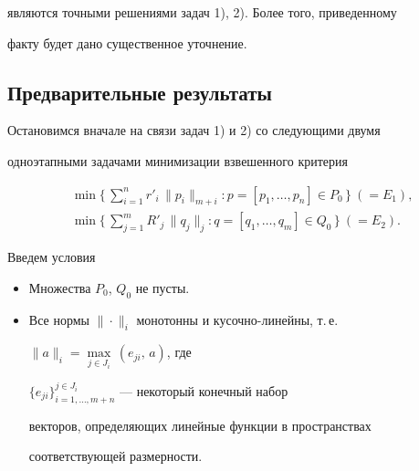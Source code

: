 являются точными решениями задач 1), 2). Более того, приведенному


факту будет дано существенное уточнение.


\addtocounter{footnote}{-1}





\subsection{Предварительные результаты}





Остановимся вначале на связи задач 1) и 2) со следующими двумя


одноэтапными задачами минимизации взвешенного критерия


\begin{align}


\label{F14}


&\min \bigg\{\, \sum^n_{i=1} r'_i\,\| p_i\|_{m+i}: p=[p_1,


\dotsc , p_n] \in P_0\,\bigg\}\ (=E_1),\\


\label{F15}


&\min \bigg\{\, \sum^m_{j=1} R'_j\,\| q_j\|_{j} : q=[q_1,


\dotsc, q_m] \in Q_0\, \bigg\}\ (=E_2).


\end{align}





Введем условия


\begin{itemize}


\item[B1.] Множества $P_0$, $Q_0$ не пусты.


\item[B2.] Все нормы $\|\cdot \|_i$ монотонны и кусочно-линейны, т.\,е.{}


$\|a\|_i=\max\limits_{j\in J_i}\,(e_{ji},\, a)$, где


$\{e_{ji}\}^{j\in J_i}_{i=1,\dotsc,m+n}$ --- некоторый конечный набор


векторов, определяющих линейные функции в пространствах


соответствующей размерности.


\end{itemize}





